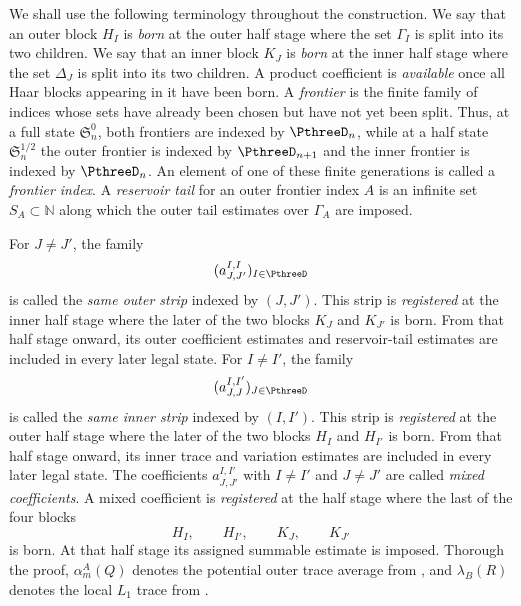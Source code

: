 \documentclass[11pt,reqno]{amsart}
\makeatletter
\theoremstyle{plain}
\theoremstyle{definition}
\newcounter{problempaper}
\newenvironment{problempaperbody}{%
  \setcounter{subsection}{0}%
  \setcounter{subsubsection}{0}%
  \setcounter{paragraph}{0}%
  \renewcommand{\thesubsection}{\arabic{subsection}}%
  \renewcommand{\thesubsubsection}{\thesubsection.\arabic{subsubsection}}%
  \renewcommand{\theparagraph}{\thesubsubsection.\arabic{paragraph}}%
  \let\problem@outersection\section
  \let\problem@outersubsection\subsection
  \let\problem@outersubsubsection\subsubsection
  \let\problem@outerparagraph\paragraph
  \let\section\problem@papersection
  \let\subsection\problem@papersubsection
  \let\subsubsection\problem@papersubsubsection
}{%
  \let\section\problem@outersection
  \let\subsection\problem@outersubsection
  \let\subsubsection\problem@outersubsubsection
  \let\paragraph\problem@outerparagraph
}
\newcommand{\problem@target}[2]{%
  \hypertarget{problem-\theproblempaper-#1-#2}{}%
}
\newcommand{\problem@paperheading}[3]{%
  \par\bigskip
  \problem@target{#1}{#2}%
  \noindent{\large\bfseries #2.\quad #3\par}%
  \nobreak\smallskip
}
\newcommand{\problem@papersubheading}[3]{%
  \par\medskip
  \problem@target{#1}{#2}%
  \noindent{\normalsize\bfseries #2.\quad #3\par}%
  \nobreak\smallskip
}
\newcommand{\problem@papersubsubheading}[3]{%
  \par\smallskip
  \problem@target{#1}{#2}%
  \noindent{\normalsize\itshape #2.\quad #3.\ }%
}
\def\problem@papersection{%
  \@ifstar{\problem@papersectionstar}{\problem@papersectionnostar}%
}
\def\problem@papersectionstar#1{%
  \par\bigskip\noindent{\large\bfseries #1\par}\nobreak\smallskip
}
\def\problem@papersectionnostar#1{%
  \refstepcounter{subsection}%
  \setcounter{subsubsection}{0}%
  \setcounter{paragraph}{0}%
  \problem@paperheading{section}{\thesubsection}{#1}%
  \problem@writecontentsline{section}{\thesubsection}{#1}%
}
\def\problem@papersubsection{%
  \@ifstar{\problem@papersubsectionstar}{\problem@papersubsectionnostar}%
}
\def\problem@papersubsectionstar#1{%
  \par\medskip\noindent{\normalsize\bfseries #1\par}\nobreak\smallskip
}
\def\problem@papersubsectionnostar#1{%
  \refstepcounter{subsubsection}%
  \setcounter{paragraph}{0}%
  \problem@papersubheading{subsection}{\thesubsubsection}{#1}%
  \problem@writecontentsline{subsection}{\thesubsubsection}{#1}%
}
\def\problem@papersubsubsection{%
  \@ifstar{\problem@papersubsubsectionstar}{\problem@papersubsubsectionnostar}%
}
\def\problem@papersubsubsectionstar#1{%
  \par\smallskip\noindent{\normalsize\itshape #1.\ }%
}
\def\problem@papersubsubsectionnostar#1{%
  \refstepcounter{paragraph}%
  \problem@papersubsubheading{subsubsection}{\theparagraph}{#1}%
  \problem@writecontentsline{subsubsection}{\theparagraph}{#1}%
}
\newcommand{\problem@writecontentsline}[3]{%
  \begingroup
  \protected@write\@auxout{}{%
    \string\problemcontentsentry{\theproblempaper}{#1}{#2}{#3}{\thepage}%
  }%
  \endgroup
}
\newcommand{\problemcontentsentry}[5]{%
  \@ifundefined{problemcontents@#1}{%
    \expandafter\gdef\csname problemcontents@#1\endcsname{}%
  }{}%
  \expandafter\g@addto@macro\csname problemcontents@#1\endcsname{%
    \problemcontentsline{#1}{#2}{#3}{#4}{#5}%
  }%
}
\newcommand{\problemcontentslink}[4]{%
  \hyperlink{problem-#1-#2-#3}{#4}%
}
\newcommand{\problemcontentsline}[5]{%
  \ifstrequal{#2}{section}{%
    \par\noindent
    \problemcontentslink{#1}{#2}{#3}{\makebox[2.5em][l]{#3}#4}%
    \nobreak\dotfill
    \problemcontentslink{#1}{#2}{#3}{#5}\par
  }{%
    \ifstrequal{#2}{subsection}{%
      \par\noindent\hspace*{1.5em}%
      \problemcontentslink{#1}{#2}{#3}{\makebox[3.5em][l]{#3}#4}%
      \nobreak\dotfill
      \problemcontentslink{#1}{#2}{#3}{#5}\par
    }{%
      \par\noindent\hspace*{3em}%
      \problemcontentslink{#1}{#2}{#3}{\makebox[4.5em][l]{#3}#4}%
      \nobreak\dotfill
      \problemcontentslink{#1}{#2}{#3}{#5}\par
    }%
  }%
}
\makeatother
\begin{document}
\begin{problempaperbody}
We shall use the following terminology throughout the construction. We say that an outer block $H_I$ is \emph{born} at the outer half stage where the set $\Gamma_I$ is split into its two children. We say that an inner block $K_J$ is \emph{born} at the inner half stage where the set $\Delta_J$ is split into its two children. A product coefficient is \emph{available} once all Haar blocks appearing in it have been born. A \emph{frontier} is the finite family of indices whose sets have already been chosen but have not yet been split. Thus, at a full state $\mathfrak S_n^0$, both frontiers are indexed by $\PthreeD_n$, while at a half state $\mathfrak S_n^{1/2}$ the outer frontier is indexed by $\PthreeD_{n+1}$ and the inner frontier is indexed by $\PthreeD_n$. An element of one of these finite generations is called a \emph{frontier index}. A \emph{reservoir tail} for an outer frontier index $A$ is an infinite set $S_A\subset\mathbb N$ along which the outer tail estimates over $\Gamma_A$ are imposed.

For $J\ne J'$, the family
\begin{equation*}
        (a_{J,J'}^{I,I})_{I\in\PthreeD}
\end{equation*}
is called the \emph{same outer strip} indexed by $(J,J')$. This strip is \emph{registered} at the inner half stage where the later of the two blocks $K_J$ and $K_{J'}$ is born. From that half stage onward, its outer coefficient estimates and reservoir-tail estimates are included in every later legal state. For $I\ne I'$, the family
\begin{equation*}
        (a_{J,J}^{I,I'})_{J\in\PthreeD}
\end{equation*}
is called the \emph{same inner strip} indexed by $(I,I')$. This strip is \emph{registered} at the outer half stage where the later of the two blocks $H_I$ and $H_{I'}$ is born. From that half stage onward, its inner trace and variation estimates are included in every later legal state. The coefficients $a_{J,J'}^{I,I'}$ with $I\ne I'$ and $J\ne J'$ are called \emph{mixed coefficients}. A mixed coefficient is \emph{registered} at the half stage where the last of the four blocks
\begin{equation*}
        H_I,\qquad H_{I'},\qquad K_J,\qquad K_{J'}
\end{equation*}
is born. At that half stage its assigned summable estimate is imposed. Thorough the proof, $\alpha_m^A(Q)$ denotes the potential outer trace average from , and $\lambda_B(R)$ denotes the local $L_1$ trace from .


\end{problempaperbody}
\end{document}
